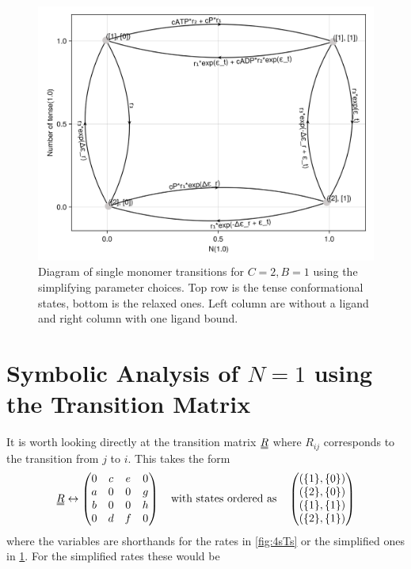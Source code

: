 \documentclass[11pt]{article}
\newcommand\set[1]{\ensuremath{\{#1\}}}
\newcommand{\duf}[2]{\stackunder[0.5pt]{\stackunder[0.8pt]{\stackunder[1pt]{\ensuremath{#1}}{\rule{\widthof{\ensuremath{#2}}*\real{0.9}}{.1ex}}}{\rule{\widthof{\ensuremath{#2}}*\real{0.9}}{.1ex}}}{}}
\newcommand{\du}[1]{\duf{#1}{#1}}
\begin{document}
\begin{figure}[H]
    \includegraphics[width=\textwidth]{../../plots/simple_sg_B=1_C=2_N=1_version=2.5.png}
    \caption{
        Diagram of single monomer transitions for $C=2,B=1$ using the simplifying parameter choices.
        Top row is the tense conformational states, bottom is the relaxed ones.
        Left column are without a ligand and right column with one ligand bound.
    }\label{fig:4sTss}
\end{figure}

\newpage
\section{Symbolic Analysis of $N=1$ using the Transition Matrix}
It is worth looking directly at the transition matrix $\du{R}$ where $R_{ij}$ corresponds to the transition from $j$ to $i$.
This takes the form
\begin{align}
    \du{R} \leftrightarrow \begin{pmatrix}
    0 & c & e & 0 \\
    a & 0 & 0 & g \\
    b & 0 & 0 & h \\
    0 & d & f & 0 \\
    \end{pmatrix} \qq{with states ordered as} \begin{pmatrix}
        (\set{1}, \set{0}) \\
        (\set{2}, \set{0}) \\
        (\set{1}, \set{1}) \\
        (\set{2}, \set{1})
    \end{pmatrix}
\end{align}
where the variables are shorthands for the rates in \cref{fig:4sTs} or the simplified ones in \cref{fig:4sTss}.
For the simplified rates these would be
\end{document}

